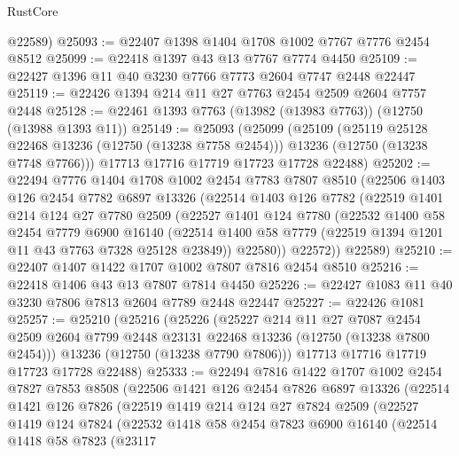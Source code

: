 \begin{lexlean}{RustCore}
\begin{coremodule}
      @22589)
@25093 := @22407 @1398 @1404 @1708 @1002 @7767 @7776 @2454 @8512
@25099 := @22418 @1397 @43 @13 @7767 @7774 @4450
@25109 := @22427 @1396 @11 @40 @3230 @7766 @7773 @2604 @7747 @2448 @22447
@25119 := @22426 @1394 @214 @11 @27 @7763 @2454 @2509 @2604 @7757 @2448
@25128 := @22461 @1393 @7763 (@13982 (@13983 @7763)) (@12750 (@13988 @1393 @11))
@25149 := @25093
    (@25099
      (@25109
        (@25119 @25128 @22468 @13236 (@12750 (@13238 @7758 @2454)))
        @13236
        (@12750 (@13238 @7748 @7766)))
      @17713
      @17716
      @17719
      @17723
      @17728
      @22488)
@25202 := @22494
    @7776
    @1404
    @1708
    @1002
    @2454
    @7783
    @7807
    @8510
    (@22506
      @1403
      @126
      @2454
      @7782
      @6897
      @13326
      (@22514
        @1403
        @126
        @7782
        (@22519
          @1401
          @214
          @124
          @27
          @7780
          @2509
          (@22527
            @1401
            @124
            @7780
            (@22532
              @1400
              @58
              @2454
              @7779
              @6900
              @16140
              (@22514 @1400 @58 @7779 (@22519 @1394 @1201 @11 @43 @7763 @7328 @25128 @23849))
              @22580))
          @22572))
      @22589)
@25210 := @22407 @1407 @1422 @1707 @1002 @7807 @7816 @2454 @8510
@25216 := @22418 @1406 @43 @13 @7807 @7814 @4450
@25226 := @22427 @1083 @11 @40 @3230 @7806 @7813 @2604 @7789 @2448 @22447
@25227 := @22426 @1081
@25257 := @25210
    (@25216
      (@25226
        (@25227
          @214
          @11
          @27
          @7087
          @2454
          @2509
          @2604
          @7799
          @2448
          @23131
          @22468
          @13236
          (@12750 (@13238 @7800 @2454)))
        @13236
        (@12750 (@13238 @7790 @7806)))
      @17713
      @17716
      @17719
      @17723
      @17728
      @22488)
@25333 := @22494
    @7816
    @1422
    @1707
    @1002
    @2454
    @7827
    @7853
    @8508
    (@22506
      @1421
      @126
      @2454
      @7826
      @6897
      @13326
      (@22514
        @1421
        @126
        @7826
        (@22519
          @1419
          @214
          @124
          @27
          @7824
          @2509
          (@22527
            @1419
            @124
            @7824
            (@22532
              @1418
              @58
              @2454
              @7823
              @6900
              @16140
              (@22514
                @1418
                @58
                @7823
                (@23117

\end{coremodule}
\end{lexlean}
